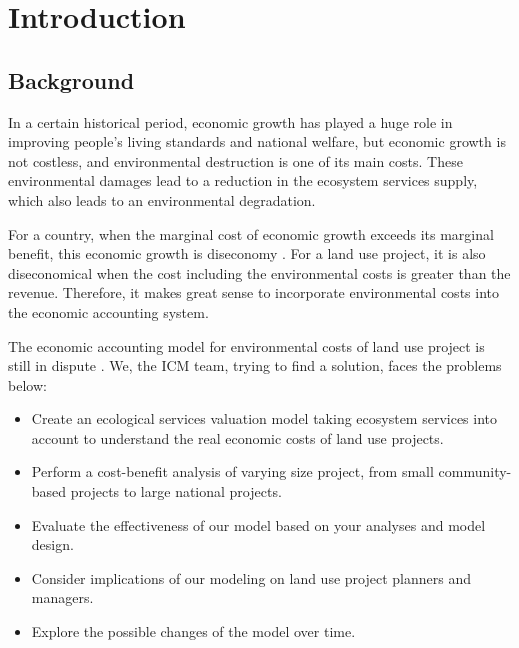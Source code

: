 \documentclass{mcmthesis}
\begin{document}
	\maketitle
	\setcounter{tocdepth}{2}
	\tableofcontents
	
	
	\section{Introduction}
	
		\subsection{Background}
		
			In a certain historical period, economic growth has played a huge role in improving people's living standards and national welfare, but economic growth is not costless, and environmental destruction is one of its main costs. These environmental damages lead to a reduction in the ecosystem services supply, which also leads to an environmental degradation.
			
			For a country, when the marginal cost of economic growth exceeds its marginal benefit, this economic growth is diseconomy \cite{daly1997beyond}. For a land use project, it is also diseconomical when the cost including the environmental costs is greater than the revenue. Therefore, it makes great sense to incorporate environmental costs into the economic accounting system.
			
			The economic accounting model for environmental costs of land use project is still in dispute \cite{plumecocq2014second}. We, the ICM team, trying to find a solution, faces the problems below:
			\begin{itemize}
				\item Create an ecological services valuation model taking ecosystem services into account to understand the real economic costs of land use projects.
				
				\item Perform a cost-benefit analysis of varying size project, from small community-based projects to large national projects. 
				
				\item Evaluate the effectiveness of our model based on your analyses and model design. 
				
				\item Consider implications of our modeling on
				land use project planners and managers.
				
				\item Explore the possible changes of the model over time.
			\end{itemize}
		
\end{document}
